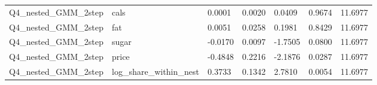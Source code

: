 \begin{table}[!htbp]
\begin{tabular}{lllllll}
\\
Q4\_nested\_GMM\_2step & cals & 0.0001 & 0.0020 & 0.0409 & 0.9674 & 11.6977
\\
Q4\_nested\_GMM\_2step & fat & 0.0051 & 0.0258 & 0.1981 & 0.8429 & 11.6977
\\
Q4\_nested\_GMM\_2step & sugar & -0.0170 & 0.0097 & -1.7505 & 0.0800 & 11.6977
\\
Q4\_nested\_GMM\_2step & price & -0.4848 & 0.2216 & -2.1876 & 0.0287 & 11.6977
\\
Q4\_nested\_GMM\_2step & log\_share\_within\_nest & 0.3733 & 0.1342 & 2.7810 & 0.0054 & 11.6977
\\
\hline
\end{tabular}
\end{table}
